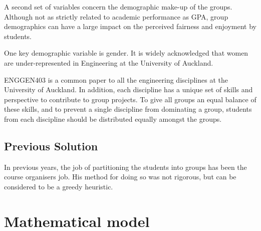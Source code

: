 \documentclass[12pt]{ORSNZ}
\begin{document}
A second set of variables concern the demographic make-up of the groups. Although not as strictly related to academic performance as GPA, group demographics can have a large impact on the perceived fairness and enjoyment by students.

One key demographic variable is gender. It is widely acknowledged that women are under-represented in Engineering at the University of Auckland.

ENGGEN403 is a common paper to all the engineering disciplines at the University of Auckland. In addition, each discipline has a unique set of skills and perspective to contribute to group projects. To give all groups an equal balance of these skills, and to prevent a single discipline from dominating a group, students from each discipline should be distributed equally amongst the groups.

\subsection{Previous Solution}
In previous years, the job of partitioning the students into groups has been the course organisers job. His method for doing so was not rigorous, but can be considered to be a greedy heuristic.  

\section{Mathematical model}
\end{document}
